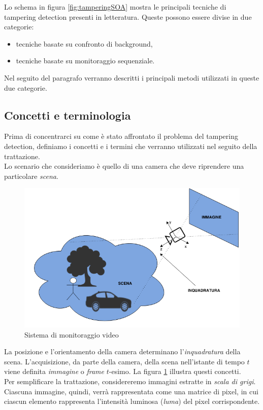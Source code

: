 Lo schema in figura \ref{fig:tamperingSOA} mostra le principali tecniche di tampering detection presenti in letteratura.
Queste possono essere divise in due categorie: 
\begin{itemize}
	\item tecniche basate su confronto di background,
	\item tecniche basate su monitoraggio sequenziale.
\end{itemize}
Nel seguito del paragrafo verranno descritti i principali metodi utilizzati in queste due categorie.
\subsection{Concetti e terminologia}
\label{concetti}
Prima di concentrarci su come \`e stato affrontato il problema del tampering detection, definiamo i concetti e i termini che verranno utilizzati nel seguito della trattazione.\\
Lo scenario che consideriamo \`e quello di una camera che deve riprendere una particolare \textit{\gls{scena}}.
\begin{figure}
	\centering
	\includegraphics[width=12cm]{./pictures/videoMonitoring}
	\caption{Sistema di monitoraggio video}
	\label{fig:videoMonitoring}
\end{figure}
\noindent 
La posizione e l'orientamento della camera determinano l'\textit{\gls{inquadratura}} della scena.
L'acquisizione, da parte della camera, della scena nell'istante di tempo $t$ viene definita \textit{immagine} o \textit{frame} $t$-esimo.
La figura \ref{fig:videoMonitoring} illustra questi concetti.\\
Per semplificare la trattazione, considereremo immagini estratte in \textit{scala di grigi}.
Ciascuna immagine, quindi, verr\`a rappresentata come una matrice di pixel, in cui ciascun elemento rappresenta l'intensit\`a luminosa (\textit{luma}) del pixel corrispondente.
